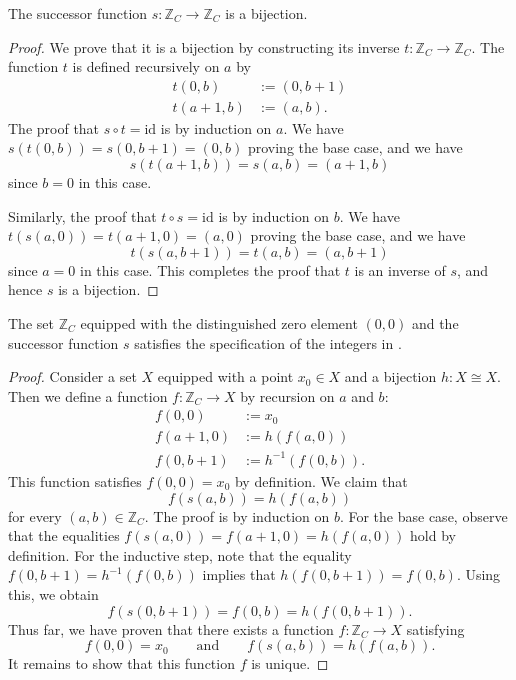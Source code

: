 \begin{theorem}
  The successor function $s:\mathbb{Z}_C\to \mathbb{Z}_C$ is a bijection.
\end{theorem}

\begin{proof}
  We prove that it is a bijection by constructing its inverse $t:\mathbb{Z}_C\to \mathbb{Z}_C$. The function $t$ is defined recursively on $a$ by
  \begin{align*}
    t(0,b) & := (0,b+1) \\
    t(a+1,b) & := (a,b).
  \end{align*}
  The proof that $s\circ t=\mathrm{id}$ is by induction on $a$. We have $s(t(0,b))=s(0,b+1)=(0,b)$ proving the base case, and we have
  \begin{equation*}
    s(t(a+1,b))=s(a,b)=(a+1,b)
  \end{equation*}
  since $b=0$ in this case.

  Similarly, the proof that $t\circ s=\mathrm{id}$ is by induction on $b$. We have $t(s(a,0))=t(a+1,0)=(a,0)$ proving the base case, and we have
  \begin{equation*}
    t(s(a,b+1))=t(a,b)=(a,b+1)
  \end{equation*}
  since $a=0$ in this case. This completes the proof that $t$ is an inverse of $s$, and hence $s$ is a bijection.
\end{proof}

\begin{theorem}
  The set $\mathbb{Z}_C$ equipped with the distinguished zero element $(0,0)$ and the successor function $s$ satisfies the specification of the integers in .
\end{theorem}

\begin{proof}
  Consider a set $X$ equipped with a point $x_0\in X$ and a bijection $h:X\cong X$. Then we define a function $f:\mathbb{Z}_C\to X$ by recursion on $a$ and $b$:
  \begin{align*}
    f(0,0) & := x_0 \\
    f(a+1,0) & := h(f(a,0)) \\
    f(0,b+1) & := h^{-1}(f(0,b)).
  \end{align*}
  This function satisfies $f(0,0)=x_0$ by definition. We claim that
  \begin{equation*}
    f(s(a,b))=h(f(a,b))
  \end{equation*}
  for every $(a,b)\in \mathbb{Z}_C$. The proof is by induction on $b$. For the base case, observe that the equalities $f(s(a,0))=f(a+1,0)=h(f(a,0))$ hold by definition. For the inductive step, note that the equality $f(0,b+1)=h^{-1}(f(0,b))$ implies that $h(f(0,b+1))=f(0,b)$. Using this, we obtain
  \begin{equation*}
    f(s(0,b+1))=f(0,b)=h(f(0,b+1)).
  \end{equation*}
  Thus far, we have proven that there exists a function $f:\mathbb{Z}_C\to X$ satisfying
  \begin{equation*}
    f(0,0)=x_0\qquad\text{and}\qquad f(s(a,b))=h(f(a,b)).
  \end{equation*}
  It remains to show that this function $f$ is unique.
\end{proof}


